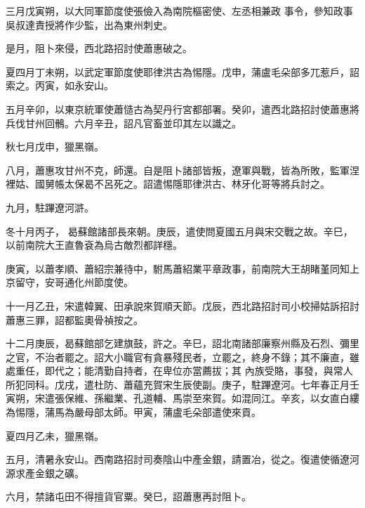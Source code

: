\begin{pinyinscope}
 三月戊寅朔，以大同軍節度使張儉入為南院樞密使、左丞相兼政
 事令，參知政事吳叔達責授將作少監，出為東州刺史。



 是月，阻卜來侵，西北路招討使蕭惠破之。



 夏四月丁未朔，以武定軍節度使耶律洪古為惕隱。戊申，蒲盧毛朵部多兀惹戶，詔索之。丙寅，如永安山。



 五月辛卯，以東京統軍使蕭慥古為契丹行宮都部署。癸卯，遣西北路招討使蕭惠將兵伐甘州回鶻。六月辛丑，詔凡官畜並印其左以識之。



 秋七月戊申，獵黑嶺。



 八月，蕭惠攻甘州不克，師還。自是阻卜諸部皆叛，遼軍與戰，皆為所敗，監軍涅裡姑、國舅帳太保曷不呂死之。詔遣惕隱耶律洪古、林牙化哥等將兵討之。



 九月，駐蹕遼河滸。



 冬十月丙子，
 曷蘇館諸部長來朝。庚辰，遣使問夏國五月與宋交戰之故。辛巳，以前南院大王直魯袞為烏古敵烈都詳穩。



 庚寅，以蕭孝順、蕭紹宗兼待中，駙馬蕭紹業平章政事，前南院大王胡睹堇同知上京留守，安哥通化州節度使。



 十一月乙丑，宋遣韓翼、田承說來賀順天節。戊辰，西北路招討司小校掃姑訴招討蕭惠三罪，詔都監奧骨禎按之。



 十二月庚辰，曷蘇館部乞建旗鼓，許之。辛巳，詔北南諸部廉察州縣及石烈、彌里之官，不治者罷之。詔大小職官有貪暴殘民者，立罷之，終身不錄；其不廉直，雖處重任，即代之；能清勤自持者，在卑位亦當薦拔；其
 內族受賂，事發，與常人所犯同科。戊戌，遣杜防、蕭蘊充賀宋生辰使副。庚子，駐蹕遼河。七年春正月壬寅朔，宋遣張保維、孫繼業、孔道輔、馬崇至來賀。如混同江。辛亥，以女直白縷為惕隱，蒲馬為嚴母部太師。甲寅，蒲盧毛朵部遣使來貢。



 夏四月乙未，獵黑嶺。



 五月，清暑永安山。西南路招討司奏陰山中產金銀，請置冶，從之。復遣使循遼河源求產金銀之礦。



 六月，禁諸屯田不得擅貨官粟。癸巳，詔蕭惠再討阻卜。




\end{pinyinscope}
